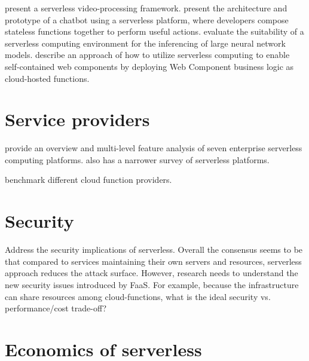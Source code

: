 \documentclass[utf8,english]{gradu3}
\begin{document}
\textcite{fouladi2017encoding} present a serverless video-processing framework. \textcite{yan16chatbot} present the architecture and prototype of a chatbot using a serverless platform, where developers compose stateless functions together to perform useful actions. \textcite{ishakian17neural} evaluate the suitability of a serverless computing environment for the inferencing of large neural network models. \textcite{ast17webcomponent} describe an approach of how to utilize serverless computing to enable self-contained web components by deploying Web Component business logic as cloud-hosted functions.

\section{Service providers}

\textcite{lynn2017preliminary} provide an overview and multi-level feature analysis of seven enterprise serverless computing platforms. \textcite{baldini17currentTrends} also has a narrower survey of serverless platforms.

\textcite{malawski18benchmark} benchmark different cloud function providers.

\section{Security}

Address the security implications of serverless. Overall the consensus seems to be that compared to services maintaining their own servers and resources, serverless approach reduces the attack surface. However, research needs to understand the new security issues introduced by FaaS. For example, because the infrastructure can share resources among cloud-functions, what is the ideal security vs. performance/cost trade-off? \parencite{van2017spec}

\section{Economics of serverless}
\end{document}
